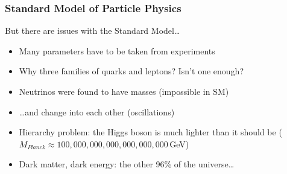 \begin{frame}[t]
 \frametitle{Standard Model of Particle Physics}
 \begin{block}{But there are issues with the Standard Model\ldots}
  \begin{itemize}
   \item Many \alert{parameters} have to be taken from experiments
   \item Why \alert{three families} of quarks and leptons?  Isn't one enough?
   \item<+-> Neutrinos were found to have \alert{masses} (impossible in SM)
   \item<+-> \ldots and change into each other (\alert{oscillations})
   \begin{center}
   \end{center}
   \item<+-> \alert{Hierarchy problem}: the Higgs boson is much lighter than it should be ($M_{Planck} \approx 100,000,000,000,000,000,000$\,GeV)
   \item<+-> Dark matter, dark energy: the other 96\% of the universe\ldots
  \end{itemize}
 \end{block}
\end{frame}
